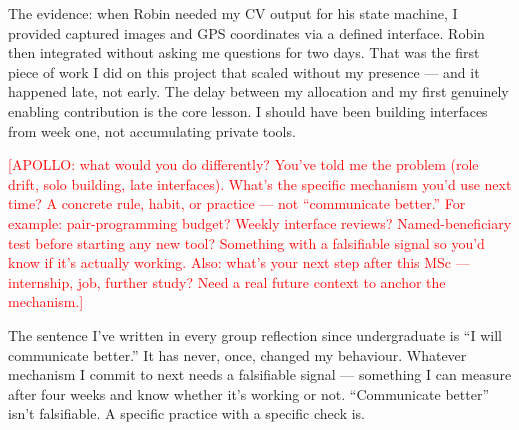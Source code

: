 The evidence: when Robin needed my CV output for his state machine, I provided captured images and GPS coordinates via a defined interface. Robin then integrated without asking me questions for two days. That was the first piece of work I did on this project that scaled without my presence --- and it happened late, not early. The delay between my allocation and my first genuinely enabling contribution is the core lesson. I should have been building interfaces from week one, not accumulating private tools.

\textcolor{red}{[APOLLO: what would you do differently? You've told me the problem (role drift, solo building, late interfaces). What's the specific mechanism you'd use next time? A concrete rule, habit, or practice --- not ``communicate better.'' For example: pair-programming budget? Weekly interface reviews? Named-beneficiary test before starting any new tool? Something with a falsifiable signal so you'd know if it's actually working. Also: what's your next step after this MSc --- internship, job, further study? Need a real future context to anchor the mechanism.]}

The sentence I've written in every group reflection since undergraduate is ``I will communicate better.'' It has never, once, changed my behaviour. Whatever mechanism I commit to next needs a falsifiable signal --- something I can measure after four weeks and know whether it's working or not. ``Communicate better'' isn't falsifiable. A specific practice with a specific check is.
